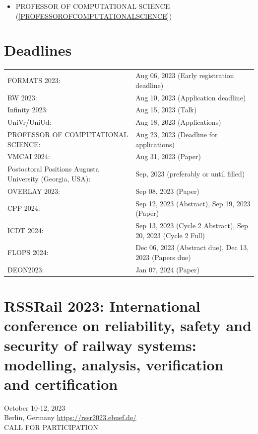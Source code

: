\documentclass[prodmode,acmtecs]{acmsmall} %
\begin{document}
\begin{itemize}
\begin{itemize}\item PROFESSOR OF COMPUTATIONAL SCIENCE (\cref{PROFESSOROFCOMPUTATIONALSCIENCE})
\end{itemize} 
\end{itemize}\section{Deadlines}\label{deadlines}\begin{tabulary}{\linewidth}{LL}FORMATS 2023:  & Aug 06, 2023 (Early registration deadline) \\
RW 2023:  & Aug 10, 2023 (Application deadline) \\
Infinity 2023:  & Aug 15, 2023 (Talk) \\
UniVr/UniUd:  & Aug 18, 2023 (Applications) \\
PROFESSOR OF COMPUTATIONAL SCIENCE:  & Aug 23, 2023 (Deadline for applications) \\
VMCAI 2024:  & Aug 31, 2023 (Paper) \\
Postoctoral Positions Augusta University (Georgia, USA):  & Sep, 2023 (preferably or until filled) \\
OVERLAY 2023:  & Sep 08, 2023 (Paper) \\
CPP 2024:  & Sep 12, 2023 (Abstract), Sep 19, 2023 (Paper) \\
ICDT 2024:  & Sep 13, 2023 (Cycle 2 Abstract), Sep 20, 2023 (Cycle 2 Full) \\
FLOPS 2024:  & Dec 06, 2023 (Abstract due), Dec 13, 2023 (Papers due) \\
DEON2023:  & Jan 07, 2024 (Paper) \\
\end{tabulary}
\section{RSSRail 2023: International conference on reliability, safety and security of railway systems:  modelling, analysis, verification and certification}\label{RSSRail2023}  October 10-12, 2023 \\ 
  Berlin, Germany \href{https://rssr2023.ebuef.de/}{https://rssr2023.ebuef.de/}\\ 
CALL FOR PARTICIPATION 
\end{document}
